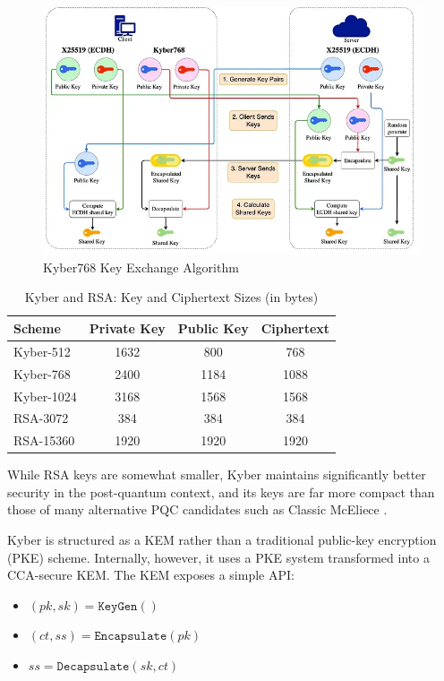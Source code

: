 \begin{figure}[htbp]
\centering
\includegraphics[width=0.9\linewidth]{figures/kyber_768.png}
\caption{Kyber768 Key Exchange Algorithm}
\label{fig:kyber_768}
\end{figure}

\begin{table}[h]
\centering
\caption{Kyber and RSA: Key and Ciphertext Sizes (in bytes)}
\label{tab:kyber_sizes}
\begin{tabular}{|l|c|c|c|}
\hline
\textbf{Scheme} & \textbf{Private Key} & \textbf{Public Key} & \textbf{Ciphertext} \\
\hline
Kyber-512 & 1632 & 800 & 768 \\
Kyber-768 & 2400 & 1184 & 1088 \\
Kyber-1024 & 3168 & 1568 & 1568 \\
RSA-3072 & 384 & 384 & 384 \\
RSA-15360 & 1920 & 1920 & 1920 \\
\hline
\end{tabular}
\end{table}

While RSA keys are somewhat smaller, Kyber maintains significantly better security in the post-quantum context, and its keys are far more compact than those of many alternative PQC candidates such as Classic McEliece \cite{kyber2021}. %

Kyber is structured as a KEM rather than a traditional public-key encryption (PKE) scheme. Internally, however, it uses a PKE system transformed into a CCA-secure KEM. The KEM exposes a simple API:
\begin{itemize}
    \item $(\mathit{pk}, \mathit{sk}) = \texttt{KeyGen}()$
    \item $(\mathit{ct}, \mathit{ss}) = \texttt{Encapsulate}(\mathit{pk})$
    \item $\mathit{ss} = \texttt{Decapsulate}(\mathit{sk}, \mathit{ct})$
\end{itemize}

